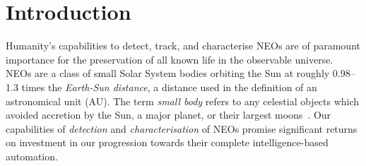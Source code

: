 \chapter{Introduction}\label{chap:introduction}

Humanity's capabilities to detect, track, and characterise \glspl{NEO} are of paramount importance for the preservation of all known life in the observable universe. \glspl{NEO} are a class of small Solar System bodies orbiting the Sun at roughly 0.98--1.3 times the \textit{Earth-Sun distance}, a distance used in the definition of an astronomical unit (AU). The term \textit{small body} refers to any celestial objects which avoided accretion by the Sun, a major planet, or their largest moons~\cite{Davidsson2021}. Our capabilities of \textit{detection} and \textit{characterisation} of \glspl{NEO} promise significant returns on investment in our progression towards their complete intelligence-based automation. %

